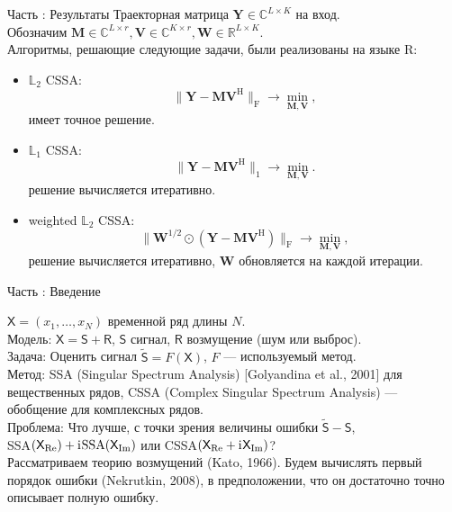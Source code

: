 \documentclass[10pt, ucs, notheorems, handout]{beamer}
\newcommand{\tX}[1]{\mathsf{#1}}
\newcommand{\iu}{\mathrm{i}\mkern1mu}
\newcommand{\RomanNumeralCaps}[1]
{\MakeUppercase{\romannumeral #1}}
\begin{document}
\begin{frame}{Часть \RomanNumeralCaps{1}: Результаты}
	Траекторная матрица $\mathbf{Y} \in \mathbb{C}^{L\times K}$ на вход.\\
	Обозначим $\mathbf{M} \in \mathbb{C}^{L\times r}, \mathbf{V} \in \mathbb{C}^{K\times r}, \mathbf{W} \in \mathbb{R}^{L\times K}$.\\
	\vspace{1em}
	Алгоритмы, решающие следующие задачи, были реализованы на языке R:
	\begin{itemize}
		\item $\mathbb{L}_2$ CSSA:
		$$ \|\mathbf{Y}-\mathbf{M}\mathbf{V}^{\mathrm{H}}\|_\mathrm{F} \longrightarrow \min_{\mathbf{M},\mathbf{V}},$$
		имеет точное решение.
		\item $\mathbb{L}_1$ CSSA:
		$$\|\mathbf{Y}-\mathbf{M}\mathbf{V}^{\mathrm{H}}\|_1 \longrightarrow \min_{\mathbf{M},\mathbf{V}}.$$
		решение вычисляется итеративно.
		\item weighted $\mathbb{L}_2$ CSSA:
		$$\|\mathbf{W}^{1/2}\odot(\mathbf{Y}-\mathbf{M}\mathbf{V}^{\mathrm{H}})\|_\mathrm{F} \longrightarrow \min_{\mathbf{M},\mathbf{V}},$$
		решение вычисляется итеративно, $\mathbf{W}$ обновляется на каждой итерации.
	\end{itemize}

\end{frame}

\begin{frame}{Часть \RomanNumeralCaps{2}: Введение}
	
	$\tX{X} = (x_1, \ldots, x_{N})$ временной ряд длины $N$.\\
	\vspace{1em}
	\alert{Модель:} $\tX{X} = \tX{S} + \tX{R}$, $\tX{S}$ сигнал, $\tX{R}$ возмущение (шум или выброс).\\
	\vspace{1em}
	\alert{Задача:} Оценить сигнал $\tilde{\tX{S}} = F(\tX{X})$, $F$ --- используемый метод.\\
	\vspace{1em}
	\alert{Метод:} SSA (Singular Spectrum Analysis) [Golyandina et al., 2001] для вещественных рядов, CSSA (Complex Singular Spectrum Analysis) --- обобщение для комплексных рядов.\\
	\vspace{1em}
	\alert{Проблема:} Что лучше, с точки зрения величины ошибки $\tilde{\tX{S}} - \tX{S}$,\\
	SSA$(\tX{X}_{\Re}) + \iu \text{SSA}(\tX{X}_{\Im})$ или CSSA$(\tX{X}_{\Re} + \iu \tX{X}_{\Im})$?\\
	\vspace{1em}
	Рассматриваем теорию возмущений (Kato, 1966). Будем вычислять первый порядок ошибки (Nekrutkin, 2008), в предположении, что он достаточно точно описывает полную ошибку.
\end{frame}
\end{document}
